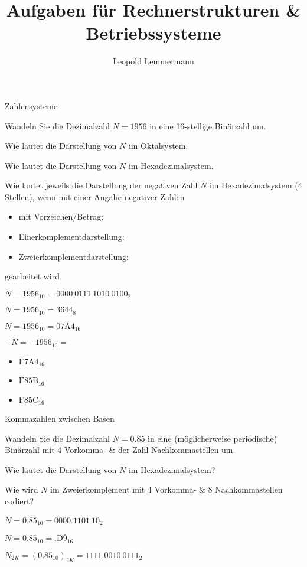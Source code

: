 \documentclass{exercisesheet}
\title{Aufgaben für Rechnerstrukturen \& Betriebssysteme}
\author{Leopold Lemmermann}
\begin{document}
\createtitle

\begin{exercise}{Zahlensysteme}
  \item Wandeln Sie die Dezimalzahl $N = 1956$ in eine 16-stellige Binärzahl um.
  \item Wie lautet die Darstellung von $N$ im Oktalsystem.
  \item Wie lautet die Darstellung von $N$ im Hexadezimalsystem.
  \item Wie lautet jeweils die Darstellung der negativen Zahl $N$ im Hexadezimalsystem (4 Stellen), wenn mit einer Angabe negativer Zahlen
  \begin{itemize}
    \item mit Vorzeichen/Betrag:
    \item Einerkomplementdarstellung:
    \item Zweierkomplementdarstellung:
  \end{itemize}
  gearbeitet wird.
\end{exercise}

\begin{solution}
  \item $N = 1956_{10} = {0000\ 0111\ 1010\ 0100}_2$
  \item $N = 1956_{10} = {3644}_8$
  \item $N = 1956_{10} = {\mathrm{07A4}}_{16}$
  \item $-N = -1956_{10} = $
  \begin{itemize}
    \item ${\mathrm{F7A4}}_{16}$
    \item ${\mathrm{F85B}}_{16}$
    \item ${\mathrm{F85C}}_{16}$
  \end{itemize}
\end{solution}

\begin{exercise}{Kommazahlen zwischen Basen}
  \item Wandeln Sie die Dezimalzahl $N = 0.85$ in eine (möglicherweise periodische) Binärzahl mit 4 Vorkomma- \& der Zahl Nachkommastellen um.
  \item Wie lautet die Darstellung von $N$ im Hexadezimalsystem?
  \item Wie wird $N$ im Zweierkomplement mit 4 Vorkomma- \& 8 Nachkommastellen codiert?
\end{exercise}

\begin{solution}
  \item $N = 0.85_{10} = {0000.11\overline{01\ 10}}_2$
  \item $N = 0.85_{10} = {\mathrm{.D\bar{9}}}_{16}$
  \item ${N}_{2K} = (0.85_{10})_{2K} = {1111.0010\ 0111}_2$
\end{solution}
\end{document}
